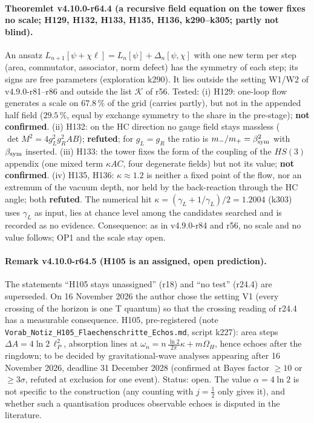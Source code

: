 \paragraph{Theoremlet v4.10.0-r64.4 (a recursive field equation on the tower fixes no scale; H129, H132, H133, H135, H136, k290--k305; partly not blind).}
An ansatz \(L_{n+1}[\psi+\chi\ell]=L_n[\psi]+\Delta_n[\psi,\chi]\) with one new term per step (area, commutator, associator, norm defect) has the
symmetry of each step; its signs are free parameters (exploration k290).  It lies outside the setting W1/W2 of v4.9.0-r81--r86 and outside the
list \(\mathcal K\) of r56.  Tested: (i) H129: one-loop flow generates a scale on \(67.8\,\%\) of the grid (carries partly), but not in the
appended half field (\(29.5\,\%\), equal by exchange symmetry to the share in the pre-stage); \textbf{not confirmed}.  (ii) H132: on the HC
direction no gauge field stays massless (\(\det M^2=4g_L^2g_R^2AB\)); \textbf{refuted}; for \(g_L=g_R\) the ratio is
\(m_-/m_+=\beta_{\rm sym}^2\) with \(\beta_{\rm sym}\) inserted.  (iii) H133: the tower fixes the form of the coupling of the \(HS(3)\) appendix
(one mixed term \(\kappa AC\), four degenerate fields) but not its value; \textbf{not confirmed}.  (iv) H135, H136: \(\kappa\approx1.2\) is neither
a fixed point of the flow, nor an extremum of the vacuum depth, nor held by the back-reaction through the HC angle; both \textbf{refuted}.  The
numerical hit \(\kappa=(\gamma_L+1/\gamma_L)/2=1.2004\) (k303) uses \(\gamma_L\) as input, lies at chance level among the candidates searched and
is recorded as no evidence.  Consequence: as in v4.9.0-r84 and r56, no scale and no value
follows; OP1 and the scale stay open.

\paragraph{Remark v4.10.0-r64.5 (H105 is an assigned, open prediction).}
The statements ``H105 stays unassigned'' (r18) and ``no test'' (r24.4) are superseded.  On 16 November 2026 the author chose the setting V1
(every crossing of the horizon is one T quantum) so that the crossing reading of r24.4 has a measurable consequence.  H105, pre-registered
(note \texttt{Vorab\_\allowbreak Notiz\_\allowbreak H105\_\allowbreak Flaechenschritte\_\allowbreak Echos.md}, script k227): area steps
\(\Delta A=4\ln2\,\ell_P^2\), absorption lines at \(\omega_n=n\,\tfrac{\ln2}{2\pi}\kappa+m\Omega_H\), hence echoes after the ringdown; to be
decided by gravitational-wave analyses appearing after 16 November 2026, deadline 31 December 2028 (confirmed at Bayes factor \(\ge10\) or
\(\ge3\sigma\), refuted at exclusion for one event).  Status: open.  The value \(\alpha=4\ln2\) is not specific to the construction (any counting
with \(j=\tfrac12\) only gives it), and whether such a quantisation produces observable echoes is disputed in the literature.

